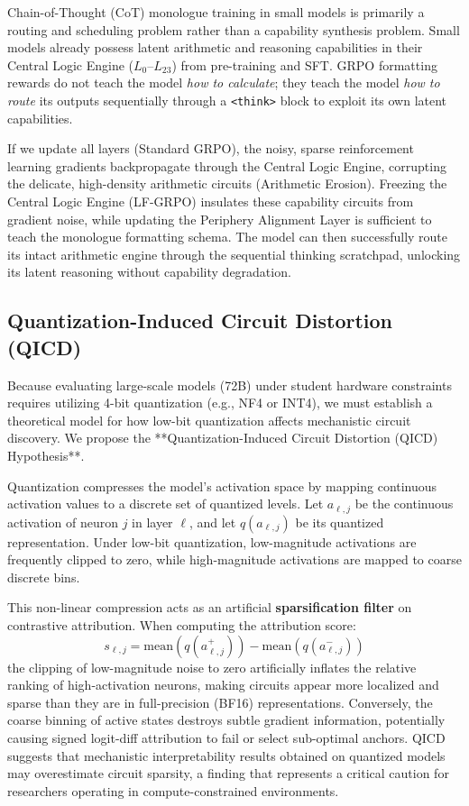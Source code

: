 \documentclass[11pt]{article}
\begin{document}
Chain-of-Thought (CoT) monologue training in small models is primarily a routing and scheduling problem rather than a capability synthesis problem. Small models already possess latent arithmetic and reasoning capabilities in their Central Logic Engine ($L_0$--$L_{23}$) from pre-training and SFT. GRPO formatting rewards do not teach the model \textit{how to calculate}; they teach the model \textit{how to route} its outputs sequentially through a \texttt{<think>} block to exploit its own latent capabilities.

If we update all layers (Standard GRPO), the noisy, sparse reinforcement learning gradients backpropagate through the Central Logic Engine, corrupting the delicate, high-density arithmetic circuits (Arithmetic Erosion). Freezing the Central Logic Engine (LF-GRPO) insulates these capability circuits from gradient noise, while updating the Periphery Alignment Layer is sufficient to teach the monologue formatting schema. The model can then successfully route its intact arithmetic engine through the sequential thinking scratchpad, unlocking its latent reasoning without capability degradation.

\subsection{Quantization-Induced Circuit Distortion (QICD)}

Because evaluating large-scale models (72B) under student hardware constraints requires utilizing 4-bit quantization (e.g., NF4 or INT4), we must establish a theoretical model for how low-bit quantization affects mechanistic circuit discovery. We propose the **Quantization-Induced Circuit Distortion (QICD) Hypothesis**.

Quantization compresses the model's activation space by mapping continuous activation values to a discrete set of quantized levels. Let $a_{\ell,j}$ be the continuous activation of neuron $j$ in layer $\ell$, and let $q(a_{\ell,j})$ be its quantized representation. Under low-bit quantization, low-magnitude activations are frequently clipped to zero, while high-magnitude activations are mapped to coarse discrete bins.

This non-linear compression acts as an artificial \textbf{sparsification filter} on contrastive attribution. When computing the attribution score:
\begin{equation}
s_{\ell,j} = \text{mean}(q(a_{\ell,j}^+)) - \text{mean}(q(a_{\ell,j}^-))
\end{equation}
the clipping of low-magnitude noise to zero artificially inflates the relative ranking of high-activation neurons, making circuits appear more localized and sparse than they are in full-precision (BF16) representations. Conversely, the coarse binning of active states destroys subtle gradient information, potentially causing signed logit-diff attribution to fail or select sub-optimal anchors. QICD suggests that mechanistic interpretability results obtained on quantized models may overestimate circuit sparsity, a finding that represents a critical caution for researchers operating in compute-constrained environments.
\end{document}
